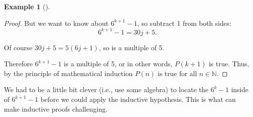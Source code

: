 \documentclass[10pt,]{book}
\theoremstyle{plain}
\theoremstyle{definition}
\newtheorem{example}[theorem]{Example}
\theoremstyle{definition}
\theoremstyle{definition}
\numberwithin{equation}{chapter}
\def\N{\mathbb N}
\begin{document}
\begin{example}[]
\begin{proof}
But we want to know about \(6^{k+1} - 1\), so subtract 1 from both sides:
\begin{equation*}
  6^{k+1} - 1 = 30j + 5.
\end{equation*}
%
\par

Of course \(30j+5 = 5(6j+1)\), so is a multiple of 5.
%
\par

Therefore \(6^{k+1} - 1\) is a multiple of 5, or in other words, \(P(k+1)\) is true. Thus, by the principle of mathematical induction \(P(n)\) is true for all \(n \in \N\).
%
\end{proof}
\end{example}
\par

We had to be a little bit clever (i.e., use some algebra) to locate the \(6^k - 1\) inside of \(6^{k+1} - 1\) before we could apply the inductive hypothesis. This is what can make inductive proofs challenging.
%
\par
\end{document}
